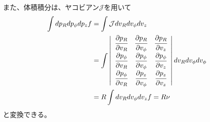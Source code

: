 また、体積積分は、ヤコビアン$\mathcal{J}$を用いて
\begin{align}
\begin{aligned}
	\int dp_R dp_{\phi} dp_z f &= \int \mathcal{J} dv_R dv_{\phi} dv_z\\
	&=
	\int
	\left|
	\begin{array}{ccc}
	 	\cfrac{\partial p_R}{\partial v_R} & \cfrac{\partial p_R}{\partial v_{\phi}} & \cfrac{\partial p_R}{\partial v_z}\\
		\cfrac{\partial p_{\phi}}{\partial v_R} & \cfrac{\partial p_{\phi}}{\partial v_{\phi}} & \cfrac{\partial p_{\phi}}{\partial v_z}\\
		\cfrac{\partial p_{\phi}}{\partial v_R} & \cfrac{\partial p_z}{\partial v_{\phi}} & \cfrac{\partial p_z}{\partial v_z}
	\end{array}
	\right| 
	 dv_R dv_{\phi} dv_{\phi}\\
	&= R \int dv_R dv_{\phi} dv_z f = R \nu    \label{integral_Cylindrical}
\end{aligned}
\end{align}
と変換できる。

